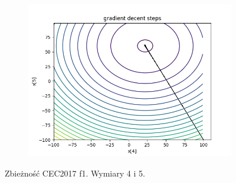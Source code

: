 \begin{figure}[h!]
\begin{subfigure}[b]{0.45\linewidth}
			\includegraphics[width=\linewidth]{photos/f1_3_2.png}
		\end{subfigure}
		\caption{Zbieżność CEC2017 f1. Wymiary 4 i 5.}
	\end{figure}
	\newpage
	
